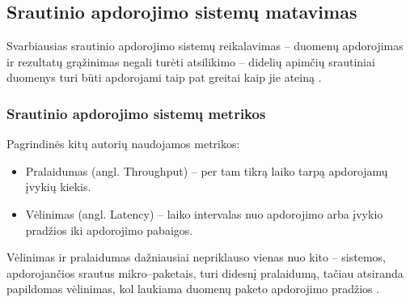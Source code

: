 \documentclass{VUMIFPSbakalaurinis}
\begin{document}
\subsection{Srautinio apdorojimo sistemų matavimas}
Svarbiausias srautinio apdorojimo sistemų reikalavimas – duomenų apdorojimas ir rezultatų grąžinimas negali turėti atsilikimo – didelių apimčių srautiniai duomenys turi būti apdorojami taip pat greitai kaip jie ateiną \cite{stonebraker20058}. 

\subsubsection{Srautinio apdorojimo sistemų metrikos}
Pagrindinės kitų autorių naudojamos metrikos:
\begin{itemize}
    \item Pralaidumas (angl. Throughput) – per tam tikrą laiko tarpą apdorojamų įvykių kiekis.
    \item Vėlinimas (angl. Latency) – laiko intervalas nuo apdorojimo arba įvykio pradžios iki apdorojimo pabaigos.
\end{itemize}
Vėlinimas ir pralaidumas dažniausiai nepriklauso vienas nuo kito – sistemos, apdorojančios srautus mikro–paketais, turi didesnį pralaidumą, tačiau atsiranda papildomas vėlinimas, kol laukiama duomenų paketo apdorojimo pradžios \cite{Karimov2018BenchmarkingDS}. \par
\end{document}
